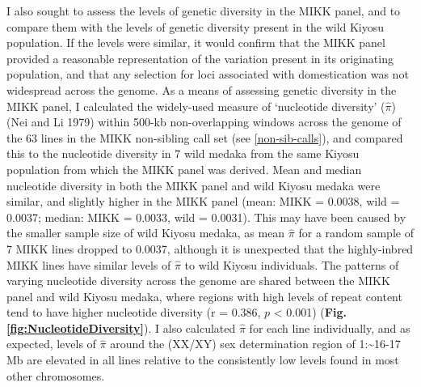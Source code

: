 \documentclass[
]{book}
\begin{document}
I also sought to assess the levels of genetic diversity in the MIKK panel, and to compare them with the levels of genetic diversity present in the wild Kiyosu population. If the levels were similar, it would confirm that the MIKK panel provided a reasonable representation of the variation present in its originating population, and that any selection for loci associated with domestication was not widespread across the genome. As a means of assessing genetic diversity in the MIKK panel, I calculated the widely-used measure of `nucleotide diversity' (\(\hat{\pi}\)) (Nei and Li 1979) within 500-kb non-overlapping windows across the genome of the 63 lines in the MIKK non-sibling call set (see \ref{non-sib-calls}), and compared this to the nucleotide diversity in 7 wild medaka from the same Kiyosu population from which the MIKK panel was derived. Mean and median nucleotide diversity in both the MIKK panel and wild Kiyosu medaka were similar, and slightly higher in the MIKK panel (mean: MIKK = 0.0038, wild = 0.0037; median: MIKK = 0.0033, wild = 0.0031). This may have been caused by the smaller sample size of wild Kiyosu medaka, as mean \(\hat{\pi}\) for a random sample of 7 MIKK lines dropped to 0.0037, although it is unexpected that the highly-inbred MIKK lines have similar levels of \(\hat{\pi}\) to wild Kiyosu individuals. The patterns of varying nucleotide diversity across the genome are shared between the MIKK panel and wild Kiyosu medaka, where regions with high levels of repeat content tend to have higher nucleotide diversity (r = 0.386, \(p\) \textless{} 0.001) (\textbf{Fig. \ref{fig:NucleotideDiversity}}). I also calculated \(\hat{\pi}\) for each line individually, and as expected, levels of \(\hat{\pi}\) around the (XX/XY) sex determination region of 1:\textasciitilde16-17 Mb are elevated in all lines relative to the consistently low levels found in most other chromosomes.
\end{document}
